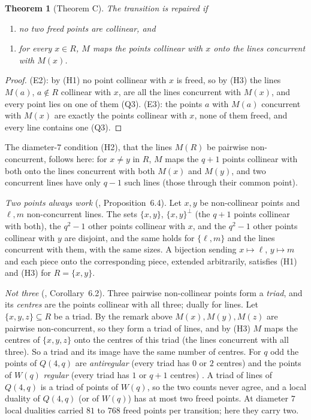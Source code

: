 \documentclass[11pt]{amsart}
\newtheorem{theorem}{Theorem}[section]
\theoremstyle{definition}
\theoremstyle{remark}
\begin{document}
\begin{theorem}[Theorem C]\label{thm:C5}
The transition is repaired if
\begin{enumerate}[label=\textup{(H\arabic*)},leftmargin=3em]
\item no two freed points are collinear, and
\end{enumerate}
\begin{enumerate}[label=\textup{(H\arabic*)},leftmargin=3em,start=3,topsep=0pt]
\item for every $x\in R$, $M$ maps the points collinear with $x$ onto the lines concurrent with $M(x)$.
\end{enumerate}
\end{theorem}

\begin{proof}
(E2): by (H1) no point collinear with $x$ is freed, so by (H3) the lines $M(a)$, $a\notin R$ collinear with $x$, are all the lines concurrent with $M(x)$, and every point lies on one of them (Q3). (E3): the points $a$ with $M(a)$ concurrent with $M(x)$ are exactly the points collinear with $x$, none of them freed, and every line contains one (Q3).
\end{proof}

The diameter-$7$ condition (H2), that the lines $M(R)$ be pairwise non-concurrent, follows here: for $x\ne y$ in $R$, $M$ maps the $q+1$ points collinear with both onto the lines concurrent with both $M(x)$ and $M(y)$, and two concurrent lines have only $q-1$ such lines (those through their common point).

\emph{Two points always work} (, Proposition~6.4). Let $x,y$ be non-collinear points and $\ell,m$ non-concurrent lines. The sets $\{x,y\}$, $\{x,y\}^\perp$ (the $q+1$ points collinear with both), the $q^2-1$ other points collinear with $x$, and the $q^2-1$ other points collinear with $y$ are disjoint, and the same holds for $\{\ell,m\}$ and the lines concurrent with them, with the same sizes. A bijection sending $x\mapsto\ell$, $y\mapsto m$ and each piece onto the corresponding piece, extended arbitrarily, satisfies (H1) and (H3) for $R=\{x,y\}$.

\emph{Not three} (, Corollary~6.2). Three pairwise non-collinear points form a \emph{triad}, and its \emph{centres} are the points collinear with all three; dually for lines. Let $\{x,y,z\}\subseteq R$ be a triad. By the remark above $M(x),M(y),M(z)$ are pairwise non-concurrent, so they form a triad of lines, and by (H3) $M$ maps the centres of $\{x,y,z\}$ onto the centres of this triad (the lines concurrent with all three). So a triad and its image have the same number of centres. For $q$ odd the points of $Q(4,q)$ are \emph{antiregular} (every triad has $0$ or $2$ centres) and the points of $W(q)$ \emph{regular} (every triad has $1$ or $q+1$ centres) \cite[1.3.6, 3.3.1]{PT}. A triad of lines of $Q(4,q)$ is a triad of points of $W(q)$, so the two counts never agree, and a local duality of $Q(4,q)$ (or of $W(q)$) has at most two freed points. At diameter $7$ local dualities carried $81$ to $768$ freed points per transition; here they carry two.
\end{document}
